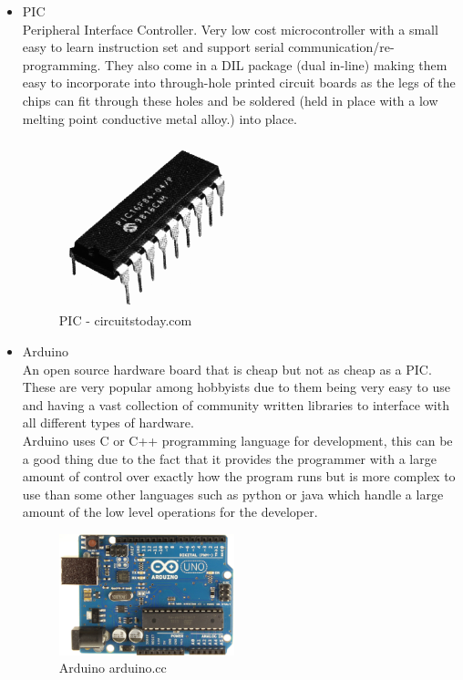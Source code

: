 \begin{itemize}
\item PIC
\\Peripheral Interface Controller.  Very low cost microcontroller with a small easy to learn instruction set and support serial communication/re-programming.  They also come in a DIL package (dual in-line) making them easy to incorporate into through-hole printed circuit boards as the legs of the chips can fit through these holes and be soldered (held in place with a low melting point conductive metal alloy.) into place.
\begin{figure}[h]
\centering
        \includegraphics[width=2.0in] {Images/pic-chip.png}
        \caption{PIC - circuitstoday.com}
        \label{PIC}
\end{figure}

\item Arduino
\\An open source hardware board that is cheap but not as cheap as a PIC.  These are very popular among hobbyists due to them being very easy to use and having a vast collection of community written libraries to interface with all different types of hardware.
\\Arduino uses C or C++ programming language for development, this can be a good thing due to the fact that it provides the programmer with a large amount of control over exactly how the program runs but is more complex to use than some other languages such as python or java which handle a large amount of the low level operations for the developer.
\begin{figure}[h]
\centering
        \includegraphics[width=2.0in] {Images/arduinouno-r3.jpg}
        \caption{Arduino arduino.cc}
        \label{Arduino}
\end{figure}


\end{itemize}
